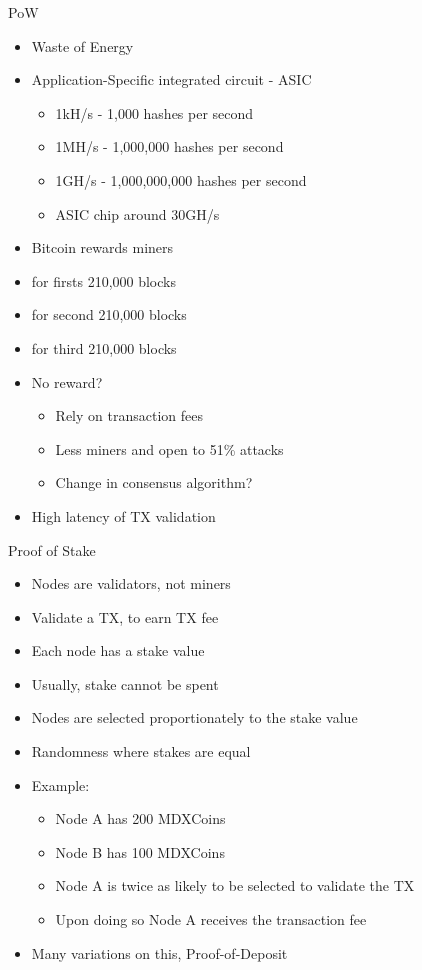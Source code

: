 \documentclass[pdf,table]{beamer}
\begin{document}
\begin{frame}{PoW}
	\begin{itemize}
		\item Waste of Energy
		\item Application-Specific integrated circuit - ASIC
			\begin{itemize}
				\item 1kH/s - 1,000 hashes per second
				\item 1MH/s - 1,000,000 hashes per second
				\item 1GH/s - 1,000,000,000 hashes per second
				\item ASIC chip around 30GH/s
			\end{itemize}
		\item Bitcoin rewards miners
		\item {} for firsts 210,000 blocks
		\item {} for second 210,000 blocks
		\item {} for third 210,000 blocks
		\item No reward? 
			\begin{itemize}
				\item Rely on transaction fees
				\item Less miners and open to 51\% attacks
				\item Change in consensus algorithm?
			\end{itemize}
		\item High latency of TX validation
	\end{itemize}
\end{frame}

\begin{frame}{Proof of Stake}
	\begin{itemize}
		\item Nodes are validators, not miners
		\item Validate a TX, to earn TX fee
		\item Each node has a stake value
		\item Usually, stake cannot be spent
		\item Nodes are selected proportionately to the stake value
		\item Randomness where stakes are equal
		\item Example:
			\begin{itemize}
				\item Node A has 200 MDXCoins
				\item Node B has 100 MDXCoins
				\item Node A is twice as likely to be selected to validate the TX
				\item Upon doing so Node A receives the transaction fee
			\end{itemize}
		\item Many variations on this, Proof-of-Deposit
	\end{itemize}
\end{frame}
\end{document}
